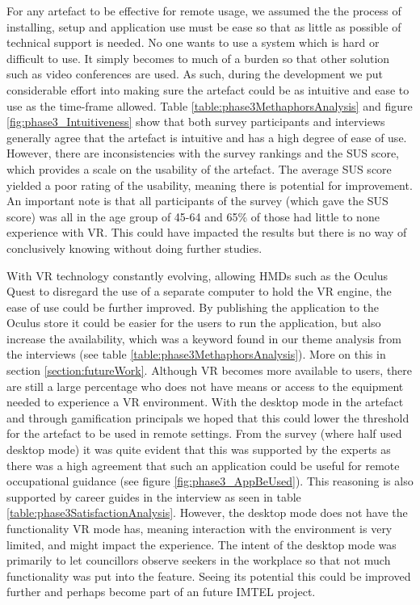 For any artefact to be effective for remote usage, we assumed the the process of installing, setup and application use must be ease so that as little as possible of technical support is needed. No one wants to use a system which is hard or difficult to use. It simply becomes to much of a burden so that other solution such as video conferences are used. As such, during the development we put considerable effort into making sure the artefact could be as intuitive and ease to use as the time-frame allowed. Table \ref{table:phase3MethaphorsAnalysis} and figure \ref{fig:phase3_Intuitiveness} show that both survey participants and interviews generally agree that the artefact is intuitive and has a high degree of ease of use. However, there are inconsistencies with the survey rankings and the SUS score, which provides a scale on the usability of the artefact. The average  SUS score yielded a poor rating of the usability, meaning there is potential for improvement. An important note is that all participants of the survey (which gave the SUS score) was all in the age group of 45-64 and 65\% of those had little to none experience with VR. This could have impacted the results but there is no way of conclusively knowing without doing further studies.  

With VR technology constantly evolving, allowing HMDs such as the Oculus Quest to disregard the use of a separate computer to hold the VR engine, the ease of use could be further improved. By publishing the application to the Oculus store it could be easier for the users to run the application, but also increase the availability, which was a keyword found in our theme analysis from the interviews (see table \ref{table:phase3MethaphorsAnalysis}). More on this in section \ref{section:futureWork}.
Although VR becomes more available to users, there are still a large percentage who does not have means or access to the equipment needed to experience a VR environment. With the desktop mode in the artefact and through gamification principals we hoped that this could lower the threshold for the artefact to be used in remote settings. From the survey (where half used desktop mode) it was quite evident that this was supported by the experts as there was a high agreement that such an application could be useful for remote occupational guidance (see figure \ref{fig:phase3_AppBeUsed}). This reasoning is also supported by career guides in the interview as seen in table \ref{table:phase3SatisfactionAnalysis}. However, the desktop mode does not have the functionality VR mode has, meaning interaction with the environment is very limited, and might impact the experience. The intent of the desktop mode was primarily to let councillors observe seekers in the workplace so that not much functionality was put into the feature. Seeing its potential this could be improved further and perhaps become part of an future IMTEL project. 

